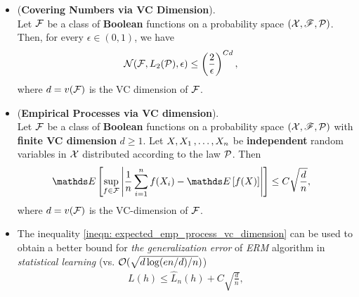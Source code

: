 \documentclass[11pt]{article}
\begin{document}
\begin{itemize}
\item \begin{theorem} (\textbf{Covering Numbers via VC Dimension}).  \citep{vershynin2018high}\\
Let ${\mathcal F}$ be a class of \textbf{Boolean} functions  on a probability space $({\mathcal X}, {\mathscr F}, {\mathcal P})$. Then, for every $\epsilon \in (0, 1)$, we
have
\begin{align}
{\mathcal N}({\mathcal F}, L_2({\mathcal P}), \epsilon) &\le \left(\frac{2}{\epsilon}\right)^{Cd}, \label{ineqn: covering_number_bound_vc_dimension}
\end{align} where $d =v({\mathcal F})$ is the VC dimension of ${\mathcal F}$.
\end{theorem}

\item  \begin{theorem} (\textbf{Empirical Processes via VC dimension}).  \citep{vershynin2018high}\\
Let ${\mathcal F}$ be a class of \textbf{Boolean} functions  on a probability space $({\mathcal X}, {\mathscr F}, {\mathcal P})$ with \textbf{finite VC dimension} $d \ge 1$. Let $X, X_1 \,{,}\ldots{,}\, X_n$ be \textbf{independent} random variables in ${\mathcal X}$ distributed according to the law ${\mathcal P}$. Then 
\begin{align}
\E{}{\sup_{f \in \cF}\abs{\frac{1}{n}\sum_{i=1}^{n}f(X_i) - \E{}{f(X)}}} &\le C\sqrt{\frac{d}{n}}, \label{ineqn: expected_emp_process_vc_dimension}
\end{align} where $d = v({\mathcal F})$ is the VC-dimension of ${\mathcal F}$.
\end{theorem}

\item \begin{remark}
The inequality \eqref{ineqn: expected_emp_process_vc_dimension} can be used to obtain a better bound for \emph{the generalization error} of \emph{ERM} algorithm in \emph{statistical learning} (vs. ${\mathcal O}(\sqrt{d\log(en/d) / n})$)
\begin{align*}
L(h) \le \widehat{L}_{n}(h) + C\sqrt{\frac{d}{n}}, 
\end{align*}
\end{remark}


\end{itemize}
\end{document}
